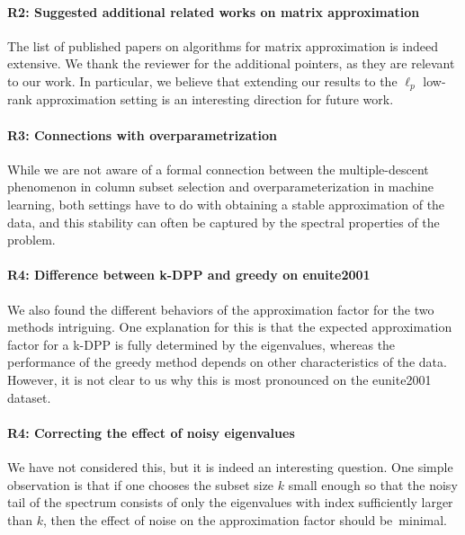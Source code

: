 \documentclass{article}
\begin{document}
\vspace{5mm}

\paragraph{R2: Suggested additional related works on matrix approximation}
The list of published papers on algorithms for matrix
approximation is indeed extensive. We thank the reviewer for the additional
pointers, as they are relevant to our work. In particular, we
believe that extending our results to the $\ell_p$ low-rank approximation
setting is an interesting direction for future work.

\vspace{5mm}

\paragraph{R3: Connections with overparametrization}
While we are not aware of a formal connection between the
multiple-descent phenomenon in column subset selection and
overparameterization in machine learning, both settings have to do
with obtaining a stable approximation of the data, and this stability can often be
captured by the spectral properties of the problem.

\vspace{5mm}

\paragraph{R4: Difference between k-DPP and greedy on enuite2001}
We also found the different behaviors of the approximation factor for
the two methods intriguing. One explanation for this is that the
expected approximation factor for a k-DPP is fully determined by the
eigenvalues, whereas the performance of the greedy method depends on
other characteristics of the data. However, it is not clear to us why
this is most pronounced on the eunite2001 dataset.
\vspace{-2mm}
\paragraph{R4: Correcting the effect of noisy eigenvalues}
We have not considered this, but it is indeed an
interesting question. One simple observation is that if one chooses the subset
size $k$ small enough so that the noisy tail of the spectrum consists of
only the eigenvalues with index sufficiently larger than $k$, then the effect of noise
on the approximation factor should be~minimal. 

{
\setlength{\bibsep}{0pt plus 0.2ex}


}
\end{document}
